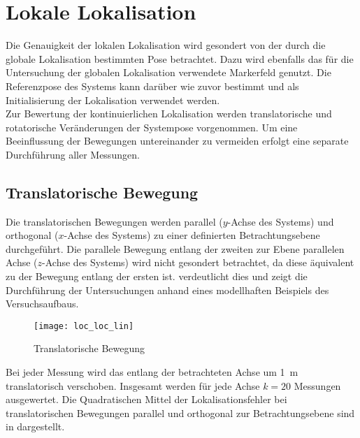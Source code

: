 


\section{Lokale Lokalisation}%
Die Genauigkeit der lokalen Lokalisation wird gesondert von der durch die globale Lokalisation bestimmten Pose betrachtet. Dazu wird ebenfalls das für die Untersuchung der globalen Lokalisation verwendete Markerfeld genutzt. Die Referenzpose des Systems kann darüber wie zuvor bestimmt und als Initialisierung der Lokalisation verwendet werden.\\

Zur Bewertung der kontinuierlichen Lokalisation werden translatorische und rotatorische Veränderungen der Systempose vorgenommen. Um eine Beeinflussung der Bewegungen untereinander zu vermeiden erfolgt eine separate Durchführung aller Messungen.\\

\subsection{Translatorische Bewegung}
Die translatorischen Bewegungen werden parallel ($y$-Achse des Systems) und orthogonal ($x$-Achse des Systems) zu einer definierten Betrachtungsebene durchgeführt. Die parallele Bewegung entlang der zweiten zur Ebene parallelen Achse ($z$-Achse des Systems) wird nicht gesondert betrachtet, da diese äquivalent zu der Bewegung entlang der ersten ist.  verdeutlicht dies und zeigt die Durchführung der Untersuchungen anhand eines modellhaften Beispiels des Versuchsaufbaus.\\

\begin{figure}[!ht]
	\begin{center}
		\texttt{[image: loc\_loc\_lin]}
		\caption{Translatorische Bewegung}
		\label{fig.transmove}
	\end{center}
\end{figure}

Bei jeder Messung wird das \kps{} entlang der betrachteten Achse um \SI{1}{\meter} translatorisch verschoben. Insgesamt werden für jede Achse $k=20$ Messungen ausgewertet. Die Quadratischen Mittel der Lokalisationsfehler bei translatorischen Bewegungen parallel und orthogonal zur Betrachtungsebene sind in  dargestellt.\\

